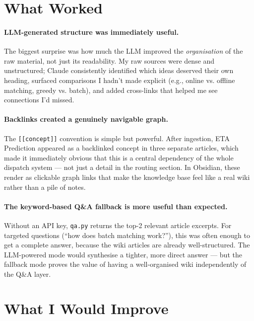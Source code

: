 \documentclass[11pt,a4paper]{article}
\begin{document}
\section{What Worked}

\paragraph{LLM-generated structure was immediately useful.}
The biggest surprise was how much the LLM improved the \emph{organisation} of the
raw material, not just its readability.
My raw sources were dense and unstructured; Claude consistently identified which ideas
deserved their own heading, surfaced comparisons I hadn't made explicit (e.g., online
vs. offline matching, greedy vs. batch), and added cross-links that helped me see
connections I'd missed.

\paragraph{Backlinks created a genuinely navigable graph.}
The \texttt{[[concept]]} convention is simple but powerful.
After ingestion, ETA Prediction appeared as a backlinked concept in three separate articles,
which made it immediately obvious that this is a central dependency of the whole dispatch
system --- not just a detail in the routing section.
In Obsidian, these render as clickable graph links that make the knowledge base feel
like a real wiki rather than a pile of notes.

\paragraph{The keyword-based Q\&A fallback is more useful than expected.}
Without an API key, \texttt{qa.py} returns the top-2 relevant article excerpts.
For targeted questions (``how does batch matching work?''), this was often enough to
get a complete answer, because the wiki articles are already well-structured.
The LLM-powered mode would synthesise a tighter, more direct answer --- but the
fallback mode proves the value of having a well-organised wiki independently of the Q\&A layer.

\section{What I Would Improve}
\end{document}
